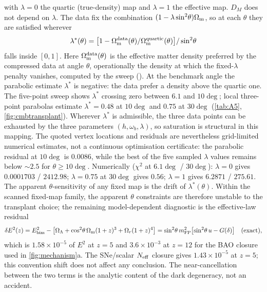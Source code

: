 with $\lambda=0$ the quartic (true-density) map and $\lambda=1$ the effective map. $D_M$ does not depend on $\lambda$. The data fix the combination $(1-\lambda\sin^2\!\theta)\Omega_{\mathrm m}$, so at each $\theta$ they are satisfied wherever
\begin{equation}
\lambda^*(\theta)=\bigl[1-\Omega_{\mathrm m}^{\rm data}(\theta)/\Omega_{\mathrm m}^{\rm quartic}(\theta)\bigr]/\sin^2\!\theta
\end{equation}
falls inside $[0,1]$. Here $\Omega_{\mathrm m}^{\rm data}(\theta)$ is the effective matter density preferred by the compressed data at angle $\theta$, operationally the density at which the fixed-$\lambda$ penalty vanishes, computed by the sweep ().
At the benchmark angle the parabolic estimate $\lambda^*$ is negative: the data prefer a density above the quartic one. The five-point sweep shows $\lambda^*$ crossing zero between $6.1$ and $10\deg$; local three-point parabolas estimate $\lambda^*=0.48$ at $10\deg$ and $0.75$ at $30\deg$ (\cref{tab:A5}, \cref{fig:cmbtransplant}). Wherever $\lambda^*$ is admissible, the three data points can be exhausted by the three parameters $(h,\omega_b,\lambda)$, so saturation is structural in this mapping. The quoted vertex locations and residuals are nevertheless grid-limited numerical estimates, not a continuous optimisation certificate: the parabolic residual at $10\deg$ is $0.0086$, while the best of the five sampled $\lambda$ values remains below $\sim2.5$ for $\theta\ge10\deg$. Numerically ($\chi^2$ at $6.1\deg$ / $30\deg$): $\lambda=0$ gives $0.0001703$ / $2412.98$; $\lambda=0.75$ at $30\deg$ gives $0.56$; $\lambda=1$ gives $6.2871$ / $275.61$.
The apparent $\theta$-sensitivity of any fixed map is the drift of $\lambda^*(\theta)$. Within the scanned fixed-map family, the apparent $\theta$ constraints are therefore unstable to the transplant choice; the remaining model-dependent diagnostic is the effective-law residual
\begin{equation}
\delta E^2(z)=E^2_{\rm bim}-\bigl[\Omega_{\Lambda}+\cos^2\!\theta\,\Omega_{\mathrm m}(1+z)^3+\Omega_{r}(1+z)^4\bigr]=\sin^2\!\theta\,m_{\mathrm{FP}}^2\bigl[\sin^2\!\theta\,u-G(\delta)\bigr]\quad\text{(exact)},
\end{equation}
which is $1.58\times10^{-5}$ of $E^2$ at $z=5$ and $3.6\times10^{-3}$ at $z=12$ for the BAO closure used in \cref{fig:mechanism}a. The SNe/scalar $N_{\rm eff}$ closure gives $1.43\times10^{-5}$ at $z=5$; this convention shift does not affect any conclusion. The near-cancellation between the two terms is the analytic content of the dark degeneracy, not an accident.

